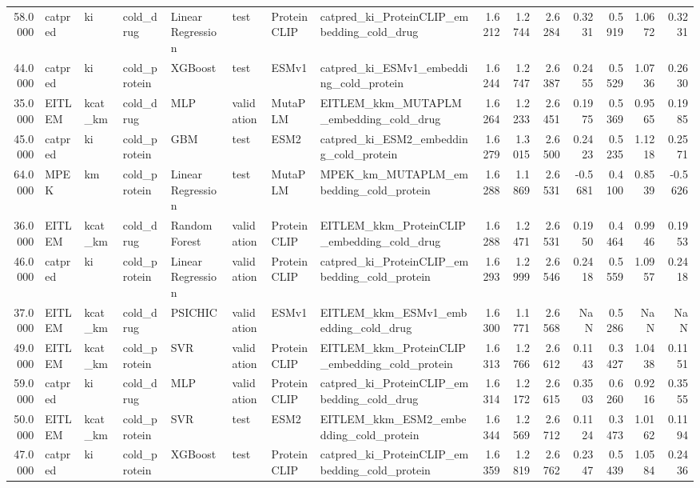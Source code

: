 \begin{tabular}{rlllllllrrrrrrr}
58.0000 & catpred & ki & cold_drug & Linear Regression & test & ProteinCLIP & catpred_ki_ProteinCLIP_embedding_cold_drug & 1.6212 & 1.2744 & 2.6284 & 0.3231 & 0.5919 & 1.0672 & 0.3231 \\
44.0000 & catpred & ki & cold_protein & XGBoost & test & ESMv1 & catpred_ki_ESMv1_embedding_cold_protein & 1.6244 & 1.2747 & 2.6387 & 0.2455 & 0.5529 & 1.0736 & 0.2630 \\
35.0000 & EITLEM & kcat_km & cold_drug & MLP & validation & MutaPLM & EITLEM_kkm_MUTAPLM_embedding_cold_drug & 1.6264 & 1.2233 & 2.6451 & 0.1975 & 0.5369 & 0.9565 & 0.1985 \\
45.0000 & catpred & ki & cold_protein & GBM & test & ESM2 & catpred_ki_ESM2_embedding_cold_protein & 1.6279 & 1.3015 & 2.6500 & 0.2423 & 0.5235 & 1.1218 & 0.2571 \\
64.0000 & MPEK & km & cold_protein & Linear Regression & test & MutaPLM & MPEK_km_MUTAPLM_embedding_cold_protein & 1.6288 & 1.1869 & 2.6531 & -0.5681 & 0.4100 & 0.8539 & -0.5626 \\
36.0000 & EITLEM & kcat_km & cold_drug & Random Forest & validation & ProteinCLIP & EITLEM_kkm_ProteinCLIP_embedding_cold_drug & 1.6288 & 1.2471 & 2.6531 & 0.1950 & 0.4464 & 0.9946 & 0.1953 \\
46.0000 & catpred & ki & cold_protein & Linear Regression & validation & ProteinCLIP & catpred_ki_ProteinCLIP_embedding_cold_protein & 1.6293 & 1.2999 & 2.6546 & 0.2418 & 0.5559 & 1.0957 & 0.2418 \\
37.0000 & EITLEM & kcat_km & cold_drug & PSICHIC & validation & ESMv1 & EITLEM_kkm_ESMv1_embedding_cold_drug & 1.6300 & 1.1771 & 2.6568 & NaN & 0.5286 & NaN & NaN \\
49.0000 & EITLEM & kcat_km & cold_protein & SVR & validation & ProteinCLIP & EITLEM_kkm_ProteinCLIP_embedding_cold_protein & 1.6313 & 1.2766 & 2.6612 & 0.1143 & 0.3427 & 1.0438 & 0.1151 \\
59.0000 & catpred & ki & cold_drug & MLP & validation & ProteinCLIP & catpred_ki_ProteinCLIP_embedding_cold_drug & 1.6314 & 1.2172 & 2.6615 & 0.3503 & 0.6260 & 0.9216 & 0.3555 \\
50.0000 & EITLEM & kcat_km & cold_protein & SVR & test & ESM2 & EITLEM_kkm_ESM2_embedding_cold_protein & 1.6344 & 1.2569 & 2.6712 & 0.1124 & 0.3473 & 1.0162 & 0.1194 \\
47.0000 & catpred & ki & cold_protein & XGBoost & test & ProteinCLIP & catpred_ki_ProteinCLIP_embedding_cold_protein & 1.6359 & 1.2819 & 2.6762 & 0.2347 & 0.5439 & 1.0584 & 0.2436 \\

\end{tabular}
